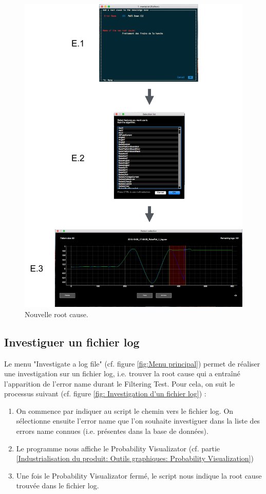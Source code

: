 \begin{figure}[H]
	\centering\includegraphics[width=15cm]{images/add_root_menu.png}
	\caption[Nouvelle root cause]{Nouvelle root cause.}
	\label{fig: Nouvelle root cause}
\end{figure} 


\subsection{Investiguer un fichier log}
\label{Industrialisation du produit: Utilisation suggérée des outils: Investiguer}
Le menu "Investigate a log file" (cf. figure \ref{fig:Menu principal}) permet de réaliser une investigation sur un fichier log, i.e. trouver la root cause qui a entraîné l'apparition de l'error name durant le Filtering Test. Pour cela, on suit le processus suivant (cf. figure \ref{fig: Investigation d'un fichier log}) : 
\begin{enumerate}
	\item On commence par indiquer au script le chemin vers le fichier log. On sélectionne ensuite l'error name que l'on souhaite investiguer dans la liste des errors name connues (i.e. présentes dans la base de données).
	\item Le programme nous affiche le Probability Visualizator (cf. partie \ref{Industrialisation du produit: Outils graphiques: Probability Visualization})
	\item Une fois le Probability Visualizator fermé, le script nous indique la root cause trouvée dans le fichier log. 
\end{enumerate}

